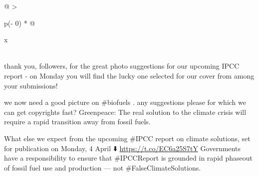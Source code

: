 \documentclass[
]{article}
\newenvironment{Shaded}{\begin{snugshade}}{\end{snugshade}}
\newcommand{\AttributeTok}[1]{\textcolor[rgb]{0.77,0.63,0.00}{#1}}
\newcommand{\CommentTok}[1]{\textcolor[rgb]{0.56,0.35,0.01}{\textit{#1}}}
\newcommand{\ConstantTok}[1]{\textcolor[rgb]{0.00,0.00,0.00}{#1}}
\newcommand{\DecValTok}[1]{\textcolor[rgb]{0.00,0.00,0.81}{#1}}
\newcommand{\FunctionTok}[1]{\textcolor[rgb]{0.00,0.00,0.00}{#1}}
\newcommand{\NormalTok}[1]{#1}
\newcommand{\OtherTok}[1]{\textcolor[rgb]{0.56,0.35,0.01}{#1}}
\newcommand{\SpecialCharTok}[1]{\textcolor[rgb]{0.00,0.00,0.00}{#1}}
\newcommand{\StringTok}[1]{\textcolor[rgb]{0.31,0.60,0.02}{#1}}
\begin{document}
\begin{Shaded}
\end{Shaded}

\begin{longtable}[]{@{}
  >{\raggedright\arraybackslash}p{(\columnwidth - 0\tabcolsep) * }@{}}
\toprule
\begin{minipage}[b]{\linewidth}\raggedright
x
\end{minipage} \\
\midrule
\endhead
thank you, followers, for the great photo suggestions for our upcoming
IPCC report - on Monday you will find the lucky one selected for our
cover from among your submissions! \\
\bottomrule
\end{longtable}

we now need a good picture on \#biofuels . any suggestions please for
which we can get copyrights fast? \textbar{} \textbar Greenpeace: The
real solution to the climate crisis will require a rapid transition away
from fossil fuels.

What else we expect from the upcoming \#IPCC report on climate
solutions, set for publication on Monday, 4 April ⬇️
\url{https://t.co/EC6a25S7tY} \textbar{} \textbar Governments have a
responsibility to ensure that \#IPCCReport is grounded in rapid phaseout
of fossil fuel use and production --- not \#FalseClimateSolutions.
\end{document}
